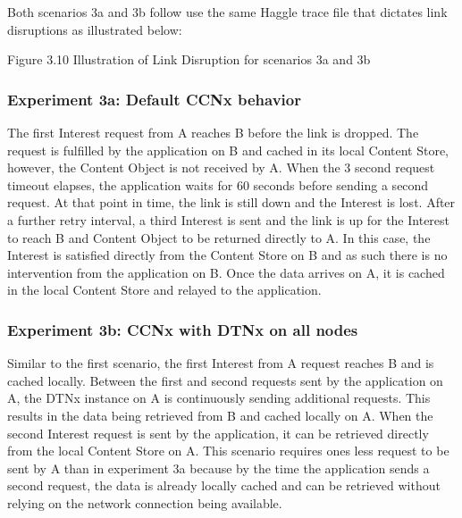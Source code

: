 \documentclass[a4paper,12pt]{report}      %
\begin{document}
\noindent Both scenarios 3a and 3b follow use the same Haggle trace file that dictates link disruptions as illustrated below:

\begin{center}Figure 3.10 Illustration of Link Disruption for scenarios 3a and 3b\end{center}

\subsubsection{Experiment 3a: Default CCNx behavior}


The first Interest request from A reaches B before the link is dropped. The request is fulfilled by the
application on B and cached in its local Content Store, however, the Content Object is not received by
A. When the 3 second request timeout elapses, the application waits for 60 seconds before sending a
second request. At that point in time, the link is still down and the Interest is lost. After a further retry
interval, a third Interest is sent and the link is up for the Interest to reach B and Content Object to be
returned directly to A. In this case, the Interest is satisfied directly from the Content Store on B and as
such there is no intervention from the application on B. Once the data arrives on A, it is cached in the
local Content Store and relayed to the application.

\subsubsection{Experiment 3b: CCNx with DTNx on all nodes}


Similar to the first scenario, the first Interest from A request reaches B and is cached locally. Between
the first and second requests sent by the application on A, the DTNx instance on A is continuously
sending additional requests. This results in the data being retrieved from B and cached locally on A.
When the second Interest request is sent by the application, it can be retrieved directly from the local
Content Store on A. This scenario requires ones less request to be sent by A than in experiment 3a
because by the time the application sends a second request, the data is already locally cached and can
be retrieved without relying on the network connection being available.
\end{document}
